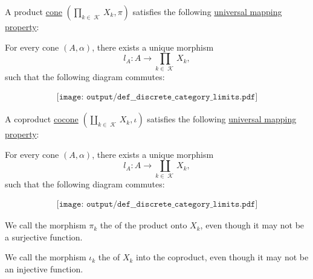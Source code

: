 \begin{definition}
  \begin{minipage}[t]{0.47\textwidth}
    A product \hyperref[def:category_of_cones/cone]{cone} \( (\prod_{k \in \mscrK} X_k, \pi) \) satisfies the following \hyperref[rem:limit_universal_mapping_property]{universal mapping property}:
    \begin{displayquote}
      For every cone \( (A, \alpha) \), there exists a unique morphism
      \begin{equation*}
        l_A: A \to \prod_{k \in \mscrK} X_k,
      \end{equation*}
      such that the following diagram commutes:
    \end{displayquote}
    \begin{equation}\label{eq:def:discrete_category_limits/product}
      \begin{aligned}
        \texttt{[image: output/def\_\_discrete\_category\_limits.pdf]}
      \end{aligned}
    \end{equation}
  \end{minipage}
  \hfill
  \begin{minipage}[t]{0.47\textwidth}
    A coproduct \hyperref[def:category_of_cones/cocone]{cocone} \( (\coprod_{k \in \mscrK} X_k, \iota) \) satisfies the following \hyperref[rem:limit_universal_mapping_property]{universal mapping property}:
    \begin{displayquote}
      For every cone \( (A, \alpha) \), there exists a unique morphism
      \begin{equation*}
        l_A: A \to \coprod_{k \in \mscrK} X_k,
      \end{equation*}
      such that the following diagram commutes:
    \end{displayquote}
    \begin{equation}\label{eq:def:discrete_category_limits/coproduct}
      \begin{aligned}
        \texttt{[image: output/def\_\_discrete\_category\_limits.pdf]}
      \end{aligned}
    \end{equation}
  \end{minipage}

  \begin{minipage}[t]{0.47\textwidth}
    We call the morphism \( \pi_k \) the  of the product onto \( X_k \), even though it may not be a surjective function.
  \end{minipage}
  \hfill
  \begin{minipage}[t]{0.47\textwidth}
    We call the morphism \( \iota_k \) the  of \( X_k \) into the coproduct, even though it may not be an injective function.
  \end{minipage}
  \medskip


\end{definition}
